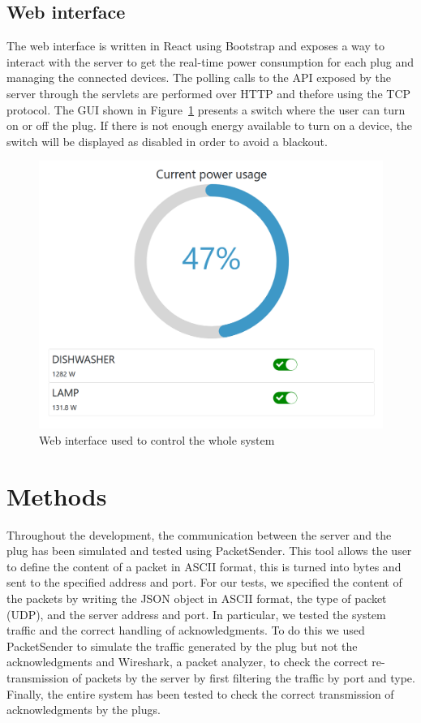 \documentclass[conference]{IEEEtran}
\begin{document}
\subsection{Web interface}\label{WI}
The web interface is written in React using Bootstrap and exposes a way to interact with the server to get the real-time power consumption for each plug and managing the connected devices. The polling calls to the API exposed by the server through the servlets are performed over HTTP and thefore using the TCP protocol. The GUI shown in Figure~\ref{fig:simulatedwebapp} presents a switch where the user can turn on or off the plug. If there is not enough energy available to turn on a device, the switch will be displayed as disabled in order to avoid a blackout.
\begin{figure}[htbp]
	\centering
	\includegraphics[width=0.7\linewidth]{assets/simulated_webapp}
	\caption{Web interface used to control the whole system}
	\label{fig:simulatedwebapp}
\end{figure}

\section{Methods}
Throughout the development, the communication between the server and the plug has been simulated and tested using PacketSender. This tool allows the user to define the content of a packet in ASCII format, this is turned into bytes and sent to the specified address and port. For our tests, we specified the content of the packets by writing the JSON object in ASCII format, the type of packet (UDP), and the server address and port. In particular, we tested the system traffic and the correct handling of acknowledgments. To do this we used PacketSender to simulate the traffic generated by the plug but not the acknowledgments and Wireshark, a packet analyzer, to check the correct re-transmission of packets by the server by first filtering the traffic by port and type. Finally, the entire system has been tested to check the correct transmission of acknowledgments by the plugs.
\end{document}
